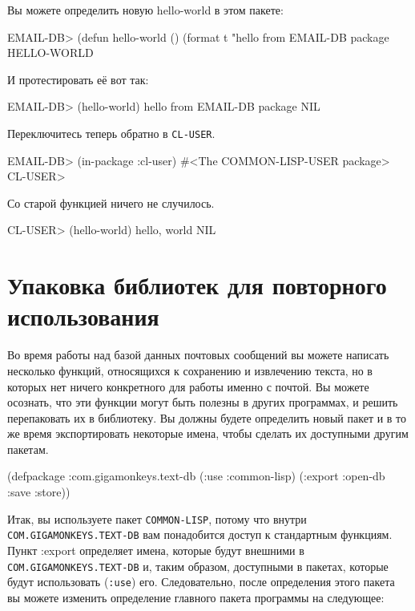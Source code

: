 Вы можете определить новую hello-world в этом пакете:

\begin{myverb}
EMAIL-DB> (defun hello-world () (format t "hello from EMAIL-DB package~%
HELLO-WORLD
\end{myverb}

И протестировать её вот так:

\begin{myverb}
EMAIL-DB> (hello-world)
hello from EMAIL-DB package
NIL
\end{myverb}

Переключитесь теперь обратно в \lstinline{CL-USER}.

\begin{myverb}
EMAIL-DB> (in-package :cl-user)
#<The COMMON-LISP-USER package>
CL-USER> 
\end{myverb}

Со старой функцией ничего не случилось.

\begin{myverb}
CL-USER> (hello-world)
hello, world
NIL
\end{myverb}

\section{Упаковка библиотек для повторного использования}

Во время работы над базой данных почтовых сообщений вы можете написать несколько функций,
относящихся к сохранению и извлечению текста, но в которых нет ничего конкретного для
работы именно с почтой. Вы можете осознать, что эти функции могут быть полезны в других
программах, и решить перепаковать их в библиотеку. Вы должны будете определить новый пакет
и в то же время экспортировать некоторые имена, чтобы сделать их доступными другим
пакетам.

\begin{myverb}
(defpackage :com.gigamonkeys.text-db
  (:use :common-lisp)
  (:export :open-db   
           :save
           :store))
\end{myverb}

Итак, вы используете пакет \lstinline{COMMON-LISP}, потому что внутри
\lstinline{COM.GIGAMONKEYS.TEXT-DB} вам понадобится доступ к стандартным функциям. Пункт
:export определяет имена, которые будут внешними в \lstinline{COM.GIGAMONKEYS.TEXT-DB} и,
таким образом, доступными в пакетах, которые будут использовать (\lstinline{:use}) его. Следовательно,
после определения этого пакета вы можете изменить определение главного пакета программы
на следующее:

